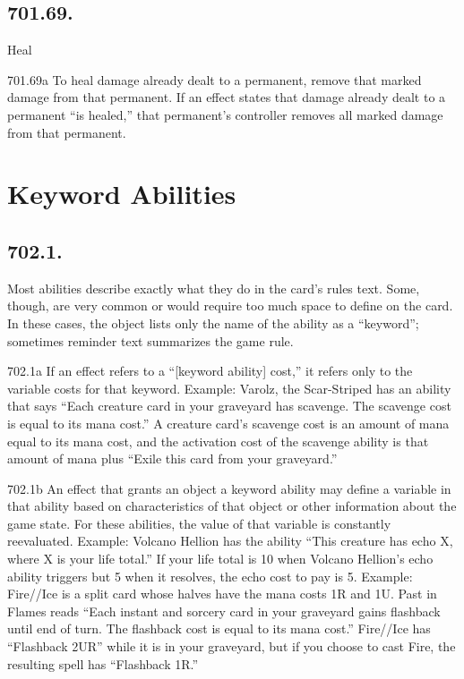 \subsection*{701.69.}
Heal

701.69a To heal damage already dealt to a permanent, remove that marked damage from that permanent. If an effect states that damage already dealt to a permanent “is healed,” that permanent’s controller removes all marked damage from that permanent.

\section{Keyword Abilities}
\subsection*{702.1.}
Most abilities describe exactly what they do in the card’s rules text. Some, though, are very common or would require too much space to define on the card. In these cases, the object lists only the name of the ability as a “keyword”; sometimes reminder text summarizes the game rule.

702.1a If an effect refers to a “[keyword ability] cost,” it refers only to the variable costs for that keyword.
Example: Varolz, the Scar-Striped has an ability that says “Each creature card in your graveyard has scavenge. The scavenge cost is equal to its mana cost.” A creature card’s scavenge cost is an amount of mana equal to its mana cost, and the activation cost of the scavenge ability is that amount of mana plus “Exile this card from your graveyard.”

702.1b An effect that grants an object a keyword ability may define a variable in that ability based on characteristics of that object or other information about the game state. For these abilities, the value of that variable is constantly reevaluated.
Example: Volcano Hellion has the ability “This creature has echo {X}, where X is your life total.” If your life total is 10 when Volcano Hellion’s echo ability triggers but 5 when it resolves, the echo cost to pay is {5}.
Example: Fire//Ice is a split card whose halves have the mana costs {1}{R} and {1}{U}. Past in Flames reads “Each instant and sorcery card in your graveyard gains flashback until end of turn. The flashback cost is equal to its mana cost.” Fire//Ice has “Flashback {2}{U}{R}” while it is in your graveyard, but if you choose to cast Fire, the resulting spell has “Flashback {1}{R}.”

